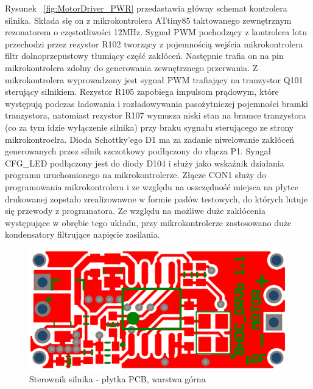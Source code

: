 Rysunek ~\ref{fig:MotorDriver_PWR} przedastawia główny schemat kontrolera silnika. Składa się on z mikrokontrolera ATtiny85 taktowanego zewnętrznym rezonatorem o częstotliwości 12MHz. Sygnał PWM pochodzący z kontrolera lotu przechodzi przez rezystor R102 tworzący z pojemnością wejścia mikrokontrolera filtr dolnoprzepustowy tłumiący część zakłóceń. Następnie trafia on na pin mikrokontrolera zdolny do generowania zewnętrznego przerwania. Z mikrokontrolera wyprowadzony jest sygnał PWM  trafiający na tranzystor Q101 sterujący silnikiem. Rezystor R105 zapobiega impulsom prądowym, które występują podczas ładowania i rozładowywania pasożytniczej pojemności bramki tranzystora, natomiast rezystor R107 wymusza niski stan na bramce tranzystora (co za tym idzie wyłączenie silnika) przy braku sygnału sterującego ze strony mikrokontroelra. Dioda Schottky'ego D1 ma za zadanie niwelowanie zakłóceń generowanych przez silnik szczotkowy podłączony do złącza P1. Syngał CFG\_LED podłączony jest do diody D104 i służy jako wskaźnik działania programu uruchomionego na mikrokontrolerze. Złącze CON1 służy do programowania mikrokontrolera i ze względu na oszczędność miejsca na płytce drukowanej zopstało zrealizowawne w formie padów testowych, do których lutuje się przewody z programatora. Ze względu na możliwe duże zakłócenia występujące w obrębie tego układu, przy mikrokontrolerze zastosowano duże kondensatory filtrujące napięcie zasilania.

\begin{figure}[H]
	\centering
	\includegraphics[scale=0.4]{Pictures/MotorDriverPCB_Top.png}
		\caption[Sterownik silnika - płytka PCB, warstrwa górna]{Sterownik silnika - płytka PCB, warstwa górna}
	\label{fig:MotorDriverPCB_Top}
\end{figure}


